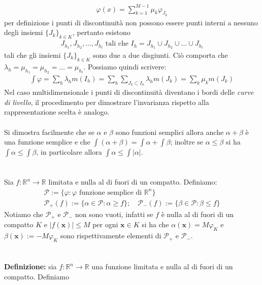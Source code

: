 \documentclass{article}
\numberwithin{equation}{subsection}
\begin{document}
\begin{align*}
    \varphi(x) = \sum_{k = 1}^{M - 1} \mu_k \varphi_{J_k} 
\end{align*}
per definizione i punti di discontinuità non possono essere punti interni a nessuno degli insiemi $\{ J_k \}_{k \in K}$, pertanto esistono
\begin{align*}
    J_{h_1}, J_{h_2}, \dots, J_{h_l} \text{ tali che } I_h = J_{h_1} \cup J_{h_2} \cup \dots \cup J_{h_l} 
\end{align*}
tali che gli insiemi $\{ J_k \}_{k \in K}$ sono due a due disgiunti. Ciò comporta che $\lambda_h = \mu_{h_1} = \mu_{h_2} = \dots = \mu_{h_l}$. Possiamo quindi scrivere:
\begin{align*}
    \int \varphi = \sum_h \lambda_h m(I_h) = \sum_h \sum_{J_k \subset I_h} \lambda_h m(J_k) = \sum_k \mu_k m(J_k) 
\end{align*}
Nel caso multidimensionale i punti di discontinuità diventano i bordi delle \textit{curve di livello}, il procedimento per dimostrare l'invarianza rispetto alla rappresentazione scelta è analogo. \\ \\
Si dimostra facilmente che se $\alpha$ e $\beta$ sono funzioni semplici allora anche $\alpha + \beta$ è una funzione semplice e che $\int (\alpha + \beta) = \int \alpha + \int \beta$; inoltre se $\alpha \leq \beta$ si ha $\int \alpha \leq \int \beta$, in particolare allora $\int \alpha \leq \int |\alpha|$. \\ \\ \\
Sia $f : \mathbb{R}^n \longrightarrow \mathbb{R}$ limitata e nulla al di fuori di un compatto. Definiamo:
\begin{gather*}
    \mathcal{P} := \{ \varphi : \varphi \text{ funzione semplice di } \mathbb{R}^n \}  \\
    \mathcal{P}_+(f) := \{ \alpha \in \mathcal{P} : \alpha \geq f \}; \quad \mathcal{P}_-(f) := \{ \beta \in \mathcal{P} : \beta \leq f \} 
\end{gather*}
Notiamo che $\mathcal{P}_+$ e $\mathcal{P}_-$ non sono vuoti, infatti se $f$ è nulla al di fuori di un compatto $K$ e $|f(\mathbf{x})| \leq M$ per ogni $\mathbf{x} \in K$ si ha che $\alpha(\mathbf{x}) = M\varphi_{K}$ e $\beta(\mathbf{x}) := -M\varphi_{K}$ sono rispettivamente elementi di $\mathcal{P}_+$ e $\mathcal{P}_-$. \\ \\ \\
\textbf{Definizione:} sia $f : \mathbb{R}^n \longrightarrow \mathbb{R}$ una funzione limitata e nulla al di fuori di un compatto. Definiamo
\end{document}
